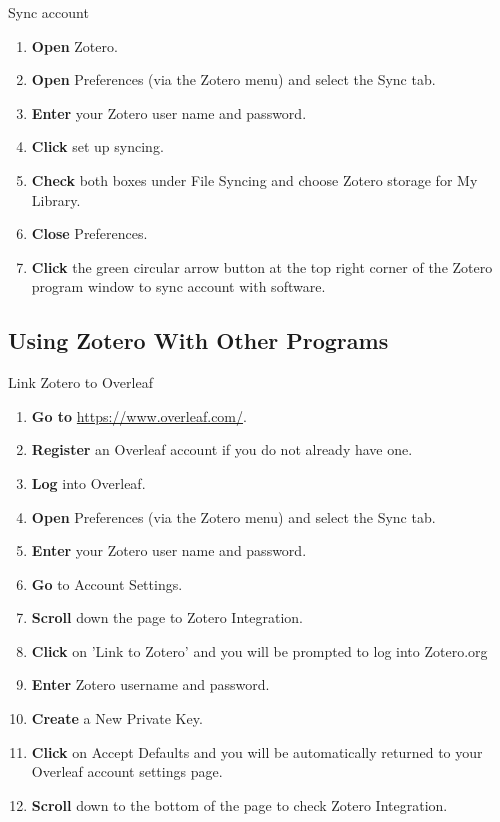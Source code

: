 \documentclass[10pt,a4paper]{article}
\begin{document}
\begin{textbox}{Sync account}
 

  

\begin{enumerate}
\item \textbf{Open} Zotero.
\item \textbf{Open} Preferences (via the Zotero menu) and select the Sync tab.
\item \textbf {Enter} your Zotero user name and password.
\item \textbf {Click} set up syncing.
\item \textbf {Check} both boxes under File Syncing and choose Zotero storage for My Library.
\item \textbf {Close} Preferences.
\item \textbf {Click} the green circular arrow button at the top right corner of the Zotero program window to sync account with software.
\end{enumerate}

\end{textbox}

\subsection{Using Zotero With Other Programs}

\begin{textbox}{Link Zotero to Overleaf}
 

  

\begin{enumerate}
\item \textbf{Go to}  \href{https://www.overleaf.com/}{https://www.overleaf.com/}. 
\item \textbf{Register} an Overleaf account if you do not already have one.
\item \textbf{Log} into Overleaf.
\item \textbf{Open} Preferences (via the Zotero menu) and select the Sync tab.
\item \textbf {Enter} your Zotero user name and password.
\item \textbf {Go} to Account Settings.
\item \textbf {Scroll} down the page to Zotero Integration.
\item \textbf {Click} on 'Link to Zotero' and you will be prompted to log into Zotero.org
\item \textbf {Enter} Zotero username and password.
\item \textbf {Create} a New Private Key.
\item \textbf {Click} on Accept Defaults and you will be automatically returned to your Overleaf account settings page.
\item \textbf {Scroll} down to the bottom of the page to check Zotero Integration.
\end{enumerate}

\end{textbox}
\end{document}
